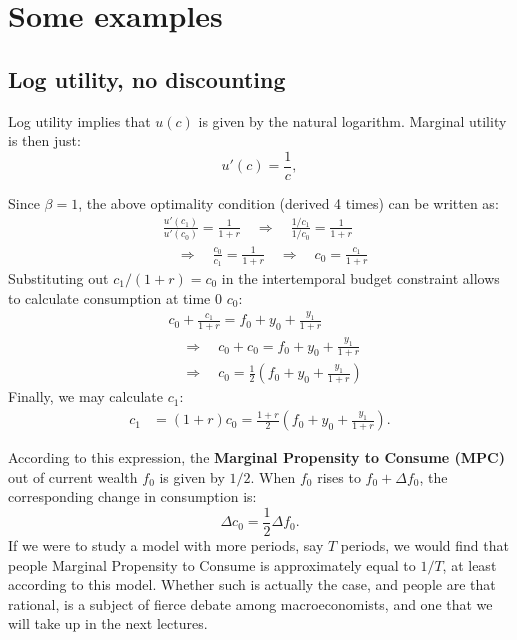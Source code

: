\documentclass[]{book}
\begin{document}
\section{Some examples}\label{some-examples}

\subsection{Log utility, no
discounting}\label{log-utility-no-discounting}

Log utility implies that \(u(c)\) is given by the natural logarithm.
Marginal utility is then just: \[u'(c)=\frac{1}{c},\]

Since \(\beta=1\), the above optimality condition (derived 4 times) can
be written as: \[
\begin{aligned}
& \frac{u'(c_{1})}{u'(c_{0})}=\frac{1}{1+r} \quad \Rightarrow \quad \frac{1/c_1}{1/c_0}=\frac{1}{1+r} \\
& \quad \Rightarrow \quad \frac{c_0}{c_1}=\frac{1}{1+r} \quad \Rightarrow \quad c_{0}=\frac{c_{1}}{1+r}
\end{aligned}
\] Substituting out \(c_{1}/(1+r)=c_0\) in the intertemporal budget
constraint allows to calculate consumption at time \(0\) \(c_0\): \[
\begin{aligned}
&c_{0}+\frac{c_{1}}{1+r}=f_{0}+y_{0}+\frac{y_{1}}{1+r}\\
&\quad \Rightarrow \quad c_{0}+c_0=f_{0}+y_{0}+\frac{y_{1}}{1+r}\\
&\quad \Rightarrow \quad c_{0}=\frac{1}{2}\left(f_{0}+y_{0}+\frac{y_{1}}{1+r}\right)
\end{aligned}
\] Finally, we may calculate \(c_1\): \[
\begin{aligned}
c_{1}&=(1+r)c_0=\frac{1+r}{2}\left(f_{0}+y_{0}+\frac{y_{1}}{1+r}\right).
\end{aligned}
\]

According to this expression, the \textbf{Marginal Propensity to Consume
(MPC)} out of current wealth \(f_{0}\) is given by \(1/2\). When \(f_0\)
rises to \(f_0+\Delta f_0\), the corresponding change in consumption is:
\[\Delta c_0 = \frac{1}{2}\Delta f_0.\] If we were to study a model with
more periods, say \(T\) periods, we would find that people Marginal
Propensity to Consume is approximately equal to \(1/T\), at least
according to this model. Whether such is actually the case, and people
are that rational, is a subject of fierce debate among macroeconomists,
and one that we will take up in the next lectures.
\end{document}
